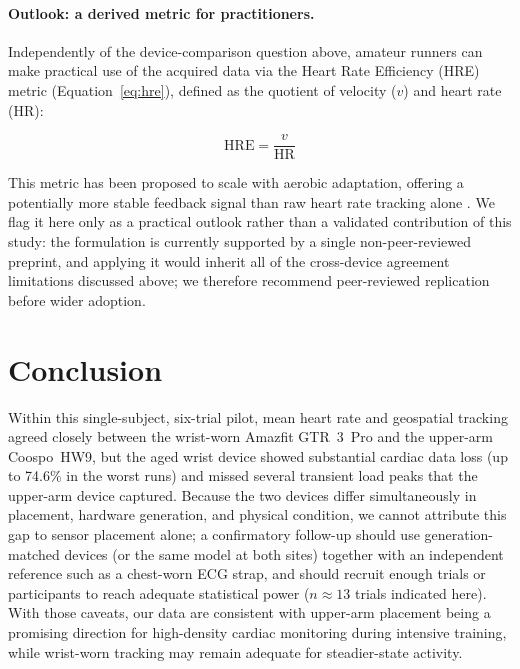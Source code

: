 \documentclass{acmsiggraph}
\begin{document}
	\medskip
	\paragraph{Outlook: a derived metric for practitioners.} Independently
	of the device-comparison question above, amateur runners can make
	practical use of the acquired data via the Heart Rate Efficiency (HRE)
	metric (Equation~\ref{eq:hre}), defined as the quotient of velocity ($v$) and heart rate (HR):
	
	\begin{equation}
		\mathrm{HRE} = \frac{v}{\mathrm{HR}}
		\label{eq:hre}
	\end{equation}
	
	This metric has been proposed to scale with aerobic adaptation, offering
	a potentially more stable feedback signal than raw heart rate tracking
	alone \cite{Votyakov2025}. We flag it here only as a practical outlook
	rather than a validated contribution of this study: the formulation is
	currently supported by a single non-peer-reviewed preprint, and applying
	it would inherit all of the cross-device agreement limitations discussed
	above; we therefore recommend peer-reviewed replication before wider
	adoption.
	
	\section{Conclusion}
	
	Within this single-subject, six-trial pilot, mean heart rate and
	geospatial tracking agreed closely between the wrist-worn Amazfit GTR~3~Pro
	and the upper-arm Coospo~HW9, but the aged wrist device showed
	substantial cardiac data loss (up to 74.6\% in the worst runs) and
	missed several transient load peaks that the upper-arm device captured.
	Because the two devices differ simultaneously in placement, hardware
	generation, and physical condition, we cannot attribute this gap to
	sensor placement alone; a confirmatory follow-up should use
	generation-matched devices (or the same model at both sites) together
	with an independent reference such as a chest-worn ECG strap, and should
	recruit enough trials or participants to reach adequate statistical
	power ($n\approx13$ trials indicated here). With those caveats, our data
	are consistent with upper-arm placement being a promising direction for
	high-density cardiac monitoring during intensive training, while
	wrist-worn tracking may remain adequate for steadier-state activity.
	
\end{document}
